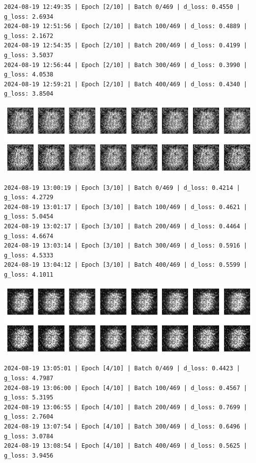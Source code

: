 \begin{lstlisting}
2024-08-19 12:49:35 | Epoch [2/10] | Batch 0/469 | d_loss: 0.4550 | g_loss: 2.6934
2024-08-19 12:51:56 | Epoch [2/10] | Batch 100/469 | d_loss: 0.4889 | g_loss: 2.1672
2024-08-19 12:54:35 | Epoch [2/10] | Batch 200/469 | d_loss: 0.4199 | g_loss: 3.5037
2024-08-19 12:56:44 | Epoch [2/10] | Batch 300/469 | d_loss: 0.3990 | g_loss: 4.0538
2024-08-19 12:59:21 | Epoch [2/10] | Batch 400/469 | d_loss: 0.4340 | g_loss: 3.8504
\end{lstlisting}

\includegraphics{img/genAdvNet/gan/output_24_3.png}

\begin{lstlisting}
2024-08-19 13:00:19 | Epoch [3/10] | Batch 0/469 | d_loss: 0.4214 | g_loss: 4.2729
2024-08-19 13:01:17 | Epoch [3/10] | Batch 100/469 | d_loss: 0.4621 | g_loss: 5.0454
2024-08-19 13:02:17 | Epoch [3/10] | Batch 200/469 | d_loss: 0.4464 | g_loss: 4.6674
2024-08-19 13:03:14 | Epoch [3/10] | Batch 300/469 | d_loss: 0.5916 | g_loss: 4.5333
2024-08-19 13:04:12 | Epoch [3/10] | Batch 400/469 | d_loss: 0.5599 | g_loss: 4.1011
\end{lstlisting}

\includegraphics{img/genAdvNet/gan/output_24_5.png}

\begin{lstlisting}
2024-08-19 13:05:01 | Epoch [4/10] | Batch 0/469 | d_loss: 0.4423 | g_loss: 4.7987
2024-08-19 13:06:00 | Epoch [4/10] | Batch 100/469 | d_loss: 0.4567 | g_loss: 5.3195
2024-08-19 13:06:55 | Epoch [4/10] | Batch 200/469 | d_loss: 0.7699 | g_loss: 2.7604
2024-08-19 13:07:54 | Epoch [4/10] | Batch 300/469 | d_loss: 0.6496 | g_loss: 3.0784
2024-08-19 13:08:54 | Epoch [4/10] | Batch 400/469 | d_loss: 0.5625 | g_loss: 3.9456
\end{lstlisting}

